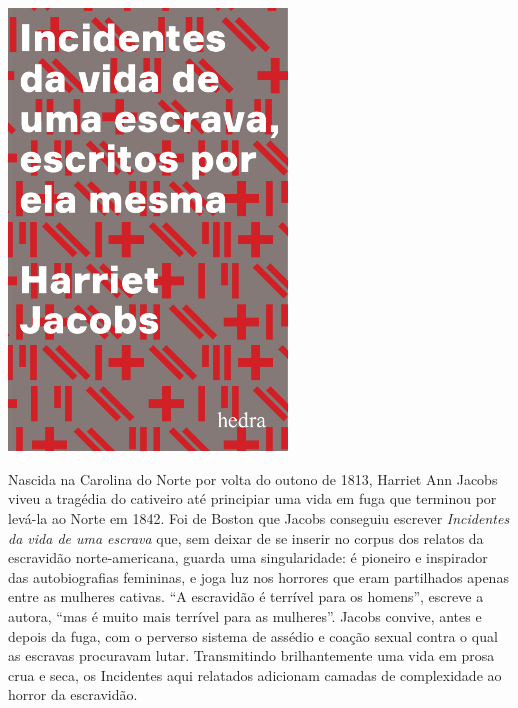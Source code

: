 \pagebreak


\begin{center}
\hspace*{-3.6cm}
\hspace*{3.1cm}\includegraphics[width=74mm]{./grid/harriet.jpeg}
\end{center}

\hspace*{-7cm}\hrulefill\hspace*{-7cm}

\medskip

\noindent{}Nascida na Carolina do Norte por volta do outono de 1813, Harriet Ann Jacobs viveu a tragédia do cativeiro até principiar uma vida em fuga que terminou por levá-la ao Norte em 1842. Foi de Boston que Jacobs conseguiu escrever \textit{Incidentes da vida de uma escrava} que, sem deixar de se inserir no corpus dos relatos da escravidão norte-americana, guarda uma singularidade: é pioneiro e inspirador das autobiografias femininas, e joga luz nos horrores que eram partilhados apenas entre as mulheres cativas.
``A escravidão é terrível para os homens'', escreve a autora, ``mas é muito mais terrível para as mulheres''. Jacobs convive, antes e depois da fuga, com o perverso sistema de assédio e coação sexual contra o qual as escravas procuravam lutar. Transmitindo brilhantemente uma vida em prosa crua e seca, os Incidentes aqui relatados adicionam camadas de complexidade ao horror da escravidão.

